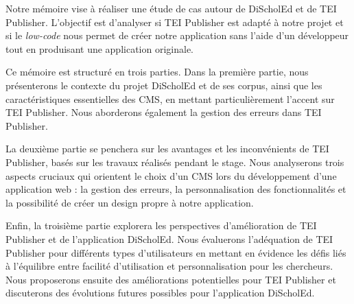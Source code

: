 Notre mémoire vise à réaliser une étude de cas autour de DiScholEd et de TEI Publisher. L'objectif est d'analyser si TEI Publisher est adapté à notre projet et si le \textit{low-code} nous permet de créer notre application sans l'aide d'un développeur tout en produisant une application originale.

Ce mémoire est structuré en trois parties. Dans la première partie, nous présenterons le contexte du projet DiScholEd et de ses corpus, ainsi que les caractéristiques essentielles des CMS, en mettant particulièrement l'accent sur TEI Publisher. Nous aborderons également la gestion des erreurs dans TEI Publisher.

La deuxième partie se penchera sur les avantages et les inconvénients de TEI Publisher, basés sur les travaux réalisés pendant le stage. Nous analyserons trois aspects cruciaux qui orientent le choix d'un CMS lors du développement d'une application web : la gestion des erreurs, la personnalisation des fonctionnalités et la possibilité de créer un design propre à notre application.

Enfin, la troisième partie explorera les perspectives d'amélioration de TEI Publisher et de l'application DiScholEd. Nous évaluerons l'adéquation de TEI Publisher pour différents types d'utilisateurs en mettant en évidence les défis liés à l'équilibre entre facilité d'utilisation et personnalisation pour les chercheurs. Nous proposerons ensuite des améliorations potentielles pour TEI Publisher et discuterons des évolutions futures possibles pour l'application DiScholEd.